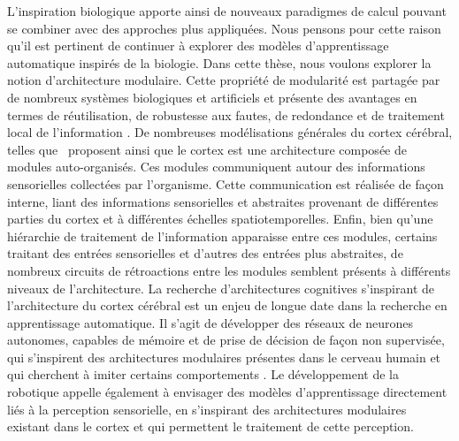 L'inspiration biologique apporte ainsi de nouveaux paradigmes de calcul pouvant se combiner avec des approches plus appliquées. Nous pensons pour cette raison qu'il est pertinent de continuer à explorer des modèles d'apprentissage automatique inspirés de la biologie.
Dans cette thèse, nous voulons explorer la notion d'architecture modulaire. Cette propriété de modularité est partagée par de nombreux systèmes biologiques et artificiels et présente des avantages en termes de réutilisation, de robustesse aux fautes, de redondance et de traitement local de l'information \parencite{clune_evolutionary_2013}.
De nombreuses modélisations générales du cortex cérébral, telles que~\cite{binzegger05, Meunier2009HierarchicalMI,sporns_structure_2013,betzel_multi-scale_2017} proposent ainsi que le cortex est une architecture composée de modules auto-organisés. Ces modules communiquent autour des informations sensorielles collectées par l'organisme. Cette communication est réalisée de façon interne, liant des informations sensorielles et abstraites provenant de différentes parties du cortex et à différentes échelles spatiotemporelles. Enfin, bien qu'une hiérarchie de traitement de l'information apparaisse entre ces modules, certains traitant des entrées sensorielles et d'autres des entrées plus abstraites, de nombreux circuits de rétroactions entre les modules semblent présents à différents niveaux de l'architecture.
La recherche d'architectures cognitives s'inspirant de l'architecture du cortex cérébral est un enjeu de longue date dans la recherche en apprentissage automatique. Il s'agit de développer des réseaux de neurones autonomes, capables de mémoire et de prise de décision de façon non supervisée, qui s'inspirent des architectures modulaires présentes dans le cerveau humain et qui cherchent à imiter certains comportements \parencite{Kotseruba201840YO}. Le développement de la robotique appelle également à envisager des modèles d'apprentissage directement liés à la perception sensorielle, en s'inspirant des architectures modulaires existant dans le cortex et qui permettent le traitement de cette perception.

